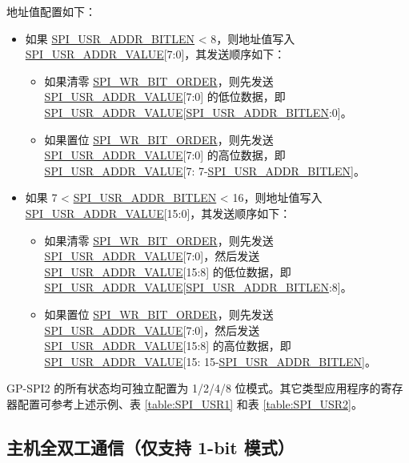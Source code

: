 \documentclass[main\_\_CN.tex]{subfiles}
\begin{document}
地址值配置如下：
\begin{itemize}
\item 如果 \hyperref[fielddesc:SPIUSRADDRBITLEN]{SPI\_USR\_ADDR\_BITLEN} < 8，则地址值写入 \hyperref[fielddesc:SPIUSRADDRVALUE]{SPI\_USR\_ADDR\_VALUE}[7:0]，其发送顺序如下：
\begin{itemize}
    \item 如果清零 \hyperref[fielddesc:SPIWRBITORDER]{SPI\_WR\_BIT\_ORDER}，则先发送 \hyperref[fielddesc:SPIUSRADDRVALUE]{SPI\_USR\_ADDR\_VALUE}[7:0] 的低位数据，即 \hyperref[fielddesc:SPIUSRADDRVALUE]{SPI\_USR\_ADDR\_VALUE}[\hyperref[fielddesc:SPIUSRADDRBITLEN]{SPI\_USR\_ADDR\_BITLEN}:0]。
    \item 如果置位 \hyperref[fielddesc:SPIWRBITORDER]{SPI\_WR\_BIT\_ORDER}，则先发送  \hyperref[fielddesc:SPIUSRADDRVALUE]{SPI\_USR\_ADDR\_VALUE}[7:0] 的高位数据，即 \hyperref[fielddesc:SPIUSRADDRVALUE]{SPI\_USR\_ADDR\_VALUE}[7: 7-\hyperref[fielddesc:SPIUSRADDRBITLEN]{SPI\_USR\_ADDR\_BITLEN}]。
\end{itemize}

\item  如果 7 < \hyperref[fielddesc:SPIUSRADDRBITLEN]{SPI\_USR\_ADDR\_BITLEN} < 16，则地址值写入 \hyperref[fielddesc:SPIUSRADDRVALUE]{SPI\_USR\_ADDR\_VALUE}[15:0]，其发送顺序如下：
\begin{itemize}
    \item 如果清零 \hyperref[fielddesc:SPIWRBITORDER]{SPI\_WR\_BIT\_ORDER}，则先发送 \hyperref[fielddesc:SPIUSRADDRVALUE]{SPI\_USR\_ADDR\_VALUE}[7:0]，然后发送 \hyperref[fielddesc:SPIUSRADDRVALUE]{SPI\_USR\_ADDR\_VALUE}[15:8] 的低位数据，即 \hyperref[fielddesc:SPIUSRADDRVALUE]{SPI\_USR\_ADDR\_VALUE}[\hyperref[fielddesc:SPIUSRADDRBITLEN]{SPI\_USR\_ADDR\_BITLEN}:8]。
    \item 如果置位 \hyperref[fielddesc:SPIWRBITORDER]{SPI\_WR\_BIT\_ORDER}，则先发送 \hyperref[fielddesc:SPIUSRADDRVALUE]{SPI\_USR\_ADDR\_VALUE}[7:0]，然后发送 \hyperref[fielddesc:SPIUSRADDRVALUE]{SPI\_USR\_ADDR\_VALUE}[15:8] 的高位数据，即 \hyperref[fielddesc:SPIUSRADDRVALUE]{SPI\_USR\_ADDR\_VALUE}[15: 15-\hyperref[fielddesc:SPIUSRADDRBITLEN]{SPI\_USR\_ADDR\_BITLEN}]。
\end{itemize}
\end{itemize}

GP-SPI2 的所有状态均可独立配置为 1/2/4/8 位模式。其它类型应用程序的寄存器配置可参考上述示例、表 \ref{table:SPI_USR1} 和表 \ref{table:SPI_USR2}。

\subsection{主机全双工通信（仅支持 1-bit 模式）}\label{GP-SPI2 1 bit}
\end{document}
